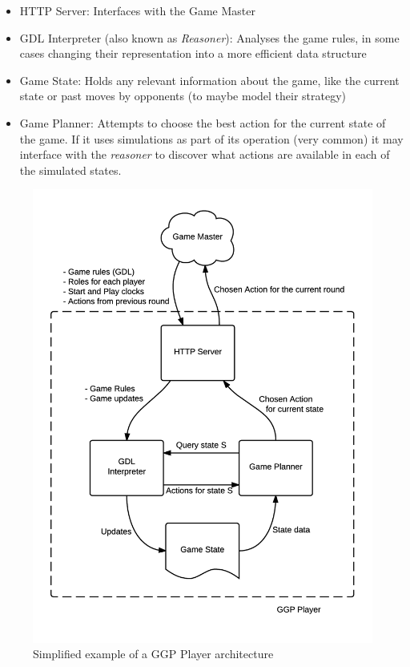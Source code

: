 \begin{itemize}
\item HTTP Server: Interfaces with the Game Master

\item \gls{GDL} Interpreter (also known as \textit{Reasoner}): Analyses the game rules, in some cases changing their representation into a more efficient data structure 

\item Game State: Holds any relevant information about the game, like the current state or past moves by opponents (to maybe model their strategy)

\item Game Planner: Attempts to choose the best action for the current state of the game. If it uses simulations as part of its operation (very common) it may interface with the \textit{reasoner} to discover what actions are available in each of the simulated states.
\end{itemize}

\begin{figure}[h]
	\centering
    \includegraphics[scale=0.8]{images/GGPplayer.png}
    \caption{Simplified example of a GGP Player architecture}
    \label{fig:player architecture}
\end{figure}

